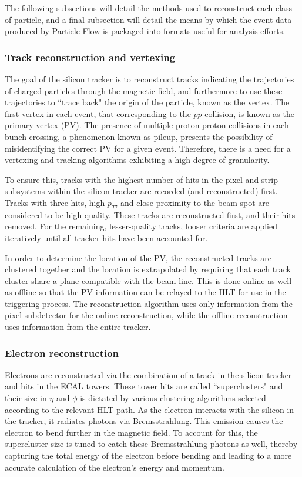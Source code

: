 The following subsections will detail the methods used to reconstruct each class of particle, and a final subsection will detail the means by which the event data produced by Particle Flow is packaged into formats useful for analysis efforts.

\subsubsection{Track reconstruction and vertexing}

The goal of the silicon tracker is to reconstruct tracks indicating the trajectories of charged particles through the magnetic field, and furthermore to use these trajectories to ``trace back" the origin of the particle, known as the vertex. The first vertex in each event, that corresponding to the $pp$ collision, is known as the primary vertex (PV). The presence of multiple proton-proton collisions in each bunch crossing, a phenomenon known as pileup, presents the possibility of misidentifying the correct PV for a given event. Therefore, there is a need for a vertexing and tracking algorithms exhibiting a high degree of granularity.

To ensure this, tracks with the highest number of hits in the pixel and strip subsystems within the silicon tracker are recorded (and reconstructed) first. Tracks with three hits, high $p_{T}$, and close proximity to the beam spot are considered to be high quality. These tracks are reconstructed first, and their hits removed. For the remaining, lesser-quality tracks, looser criteria are applied iteratively until all tracker hits have been accounted for.

In order to determine the location of the PV, the reconstructed tracks are clustered together and the location is extrapolated by requiring that each track cluster share a plane compatible with the beam line. This is done online as well as offline so that the PV information can be relayed to the HLT for use in the triggering process. The reconstruction algorithm   uses only information from the pixel subdetector for the online reconstruction, while the offline reconstruction uses information from the entire tracker.

\subsubsection{Electron reconstruction}

Electrons are reconstructed via the combination of a track in the silicon tracker and hits in the ECAL towers. These tower hits are called ``superclusters" and their size in $\eta$ and $\phi$ is dictated by various clustering algorithms selected according to the relevant HLT path. As the electron interacts with the silicon in the tracker, it radiates photons via Bremsstrahlung. This emission causes the electron to bend further in the magnetic field. To account for this, the supercluster size is tuned to catch these Bremsstrahlung photons as well, thereby capturing the total energy of the electron before bending and leading to a more accurate calculation of the electron's energy and momentum. 

